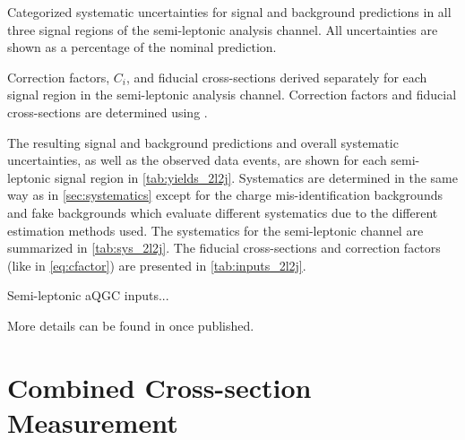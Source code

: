 \begin{table}[ht!]
\centering

\caption{Categorized systematic uncertainties 
for signal and background predictions in all three signal regions
of the semi-leptonic analysis channel.
All uncertainties are shown as a percentage of the nominal
prediction.  }
\label{tab:sys_2l2j}
\end{table}

\begin{table}[ht!]
\centering

\caption{Correction factors, $C_i$, and fiducial cross-sections derived
separately for each signal region in the semi-leptonic analysis channel. 
Correction factors and  fiducial cross-sections are determined
using \madgraph.}
\label{tab:inputs_2l2j}
\end{table}

The resulting signal and background predictions and overall systematic uncertainties,
as well as the observed data events,
are shown for each semi-leptonic signal region in \tab\ref{tab:yields_2l2j}. Systematics
are determined in the same way as in \sec\ref{sec:systematics} except for the charge
mis-identification backgrounds and fake backgrounds which evaluate different systematics due
to the different estimation methods used. The systematics for the semi-leptonic
channel are summarized in \tab\ref{tab:sys_2l2j}. The fiducial cross-sections
and correction factors (like in \eqn\eqref{eq:cfactor}) are presented in \tab\ref{tab:inputs_2l2j}.

Semi-leptonic aQGC inputs...

More details can be found in \cite{wwwcomb} once published.

\section{Combined Cross-section Measurement}
\label{sec:combined_measurement}

